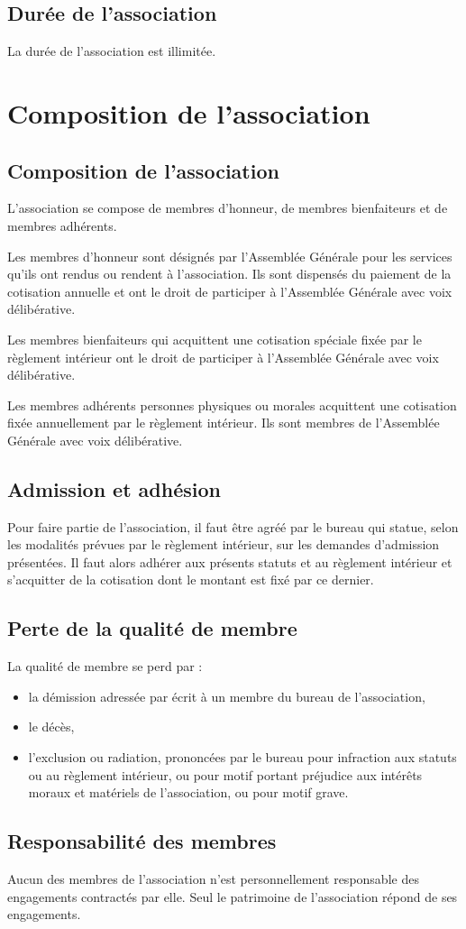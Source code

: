 \documentclass[a4paper,french,10pt]{article}
\newcommand{\article}[1]{\subsection{#1}\addtocounter{article}{1}}
\newcounter{article}
\begin{document}
\article{Durée de l’association}
\label{sec:duree}
La durée de l’association est illimitée.

\section{Composition de l’association}

\article{Composition de l’association}
\label{sec:composition}
L’association se compose de membres d'honneur, de membres bienfaiteurs
et de membres adhérents.

Les membres d'honneur sont désignés par l'Assemblée Générale pour les
services qu'ils ont rendus ou rendent à l'association. Ils sont
dispensés du paiement de la cotisation annuelle et ont le droit de
participer à l'Assemblée Générale avec voix délibérative.

Les membres bienfaiteurs qui acquittent une cotisation spéciale fixée
par le règlement intérieur ont le droit de participer à l'Assemblée
Générale avec voix délibérative.

Les membres adhérents personnes physiques ou morales acquittent une
cotisation fixée annuellement par le règlement intérieur. Ils sont
membres de l'Assemblée Générale avec voix délibérative.

\article{Admission et adhésion}
\label{sec:admission}
Pour faire partie de l’association, il faut être agréé par le bureau
qui statue, selon les modalités prévues par le règlement intérieur, sur les demandes d'admission présentées. Il faut alors adhérer aux présents
statuts et au règlement intérieur et s’acquitter de la cotisation dont le montant est fixé par ce dernier.

\article{Perte de la qualité de membre}
\label{sec:perte}
La qualité de membre se perd par :
\begin{itemize}
\item la démission adressée par écrit à un membre du bureau de l'association,

\item le décès,

\item l'exclusion ou radiation, prononcées par le bureau pour infraction
aux statuts ou au règlement intérieur, ou pour motif portant préjudice
aux intérêts moraux et matériels de l'association, ou pour motif
grave.
\end{itemize}


\article{Responsabilité des membres}
\label{sec:responsabilite}
Aucun des membres de l’association n’est personnellement responsable
des engagements contractés par elle. Seul le patrimoine de
l’association répond de ses engagements.
\end{document}
